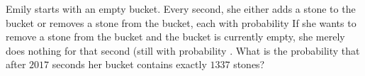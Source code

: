 Emily starts with an empty bucket. Every second, she either adds a stone to the bucket or removes a stone from the bucket, each with probability  If she wants to remove a stone from the bucket and the bucket is currently empty, she merely does nothing for that second (still with probability . What is the probability that after $2017$ seconds her bucket contains exactly $1337$ stones?